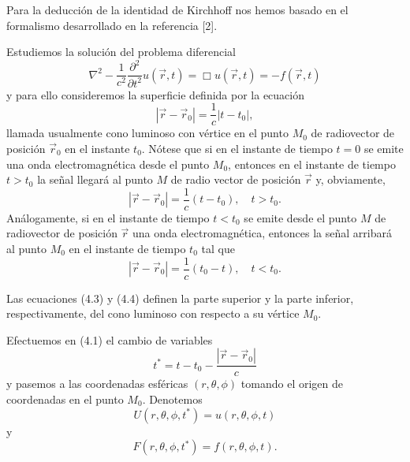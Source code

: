 \documentclass[12pt,a4paper]{book}
\begin{document}
Para la deducción de la identidad de Kirchhoff nos hemos basado en el formalismo desarrollado en la referencia [2].

Estudiemos la solución del problema diferencial
\begin{equation}
\nabla^2 - \frac{1}{c^2}\frac{\partial^2}{\partial t^2}u(\vec{r}, t) = \Box u(\vec{r}, t) = -f(\vec{r}, t)
\end{equation}
y para ello consideremos la superficie definida por la ecuación
\begin{equation}
|\vec{r} - \vec{r}_0| = \frac{1}{c}|t - t_0|,
\end{equation}
llamada usualmente cono luminoso con vértice en el punto $M_0$ de radiovector de posición $\vec{r}_0$ en el instante $t_0$. Nótese que si en el instante de tiempo $t = 0$ se emite una onda electromagnética desde el punto $M_0$, entonces en el instante de tiempo $t > t_0$ la señal llegará al punto $M$ de radio vector de posición $\vec{r}$ y, obviamente,
\begin{equation}
|\vec{r} - \vec{r}_0| = \frac{1}{c}(t - t_0), \quad t > t_0.
\end{equation}
Análogamente, si en el instante de tiempo $t < t_0$ se emite desde el punto $M$ de radiovector de posición $\vec{r}$ una onda electromagnética, entonces la señal arribará al punto $M_0$ en el instante de tiempo $t_0$ tal que
\begin{equation}
|\vec{r} - \vec{r}_0| = \frac{1}{c}(t_0 - t), \quad t < t_0.
\end{equation}

Las ecuaciones (4.3) y (4.4) definen la parte superior y la parte inferior, respectivamente, del cono luminoso con respecto a su vértice $M_0$.

Efectuemos en (4.1) el cambio de variables
\begin{equation}
t^* = t - t_0 - \frac{|\vec{r} - \vec{r}_0|}{c}
\end{equation}
y pasemos a las coordenadas esféricas $(r, \theta, \phi)$ tomando el origen de coordenadas en el punto $M_0$. Denotemos
\begin{equation}
U(r, \theta, \phi, t^*) = u(r, \theta, \phi, t)
\end{equation}
y
\begin{equation}
F(r, \theta, \phi, t^*) = f(r, \theta, \phi, t).
\end{equation}
\end{document}
